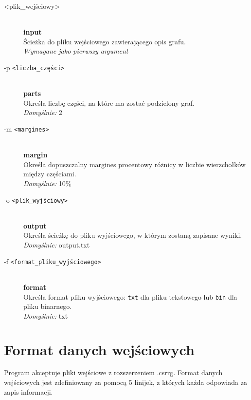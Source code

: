 \documentclass{article}
\begin{document}
\begin{description}
    \item[<plik\_wejściowy>] \hfill \\
    \textbf{input} \\
    Ścieżka do pliku wejściowego zawierającego opis grafu. \\
    \textit{Wymagane jako pierwszy argument}
    
    \item[-p \texttt{<liczba\_części>}] \hfill \\
    \textbf{parts} \\
    Określa liczbę części, na które ma zostać podzielony graf. \\
    \textit{Domyślnie:} 2
    
    \item[-m \texttt{<margines>}] \hfill \\
    \textbf{margin} \\
    Określa dopuszczalny margines procentowy różnicy w liczbie wierzchołków między częściami. \\
    \textit{Domyślnie:} 10\%
    
    \item[-o \texttt{<plik\_wyjściowy>}] \hfill \\
    \textbf{output} \\
    Określa ścieżkę do pliku wyjściowego, w którym zostaną zapisane wyniki. \\
    \textit{Domyślnie:} output.txt
    
    \item[-f \texttt{<format\_pliku\_wyjściowego>}] \hfill \\
    \textbf{format} \\
    Określa format pliku wyjściowego: \texttt{txt} dla pliku tekstowego lub \texttt{bin} dla pliku binarnego. \\
    \textit{Domyślnie:} txt
\end{description}



\section{Format danych wejściowych}

Program akceptuje pliki wejściowe z rozszerzeniem .csrrg. Format danych wejściowych jest zdefiniowany za pomocą 5 linijek, z których każda odpowiada za zapis informacji. \\
\end{document}
